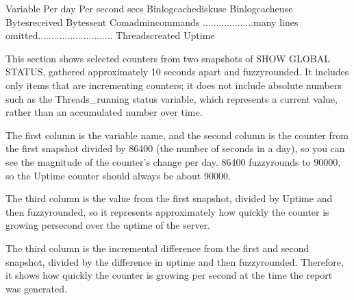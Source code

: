 \documentclass[letterpaper,10pt,english]{sphinxmanual}
\begin{document}
\begin{sphinxVerbatim}[commandchars=\\\{\}]
Variable                            Per day  Per second      secs
Binlog\PYGZus{}cache\PYGZus{}disk\PYGZus{}use                     
Binlog\PYGZus{}cache\PYGZus{}use                         
Bytes\PYGZus{}received                                       
Bytes\PYGZus{}sent                                          
Com\PYGZus{}admin\PYGZus{}commands                        
...................many lines omitted............................
Threads\PYGZus{}created                                                 
Uptime                                                      
\end{sphinxVerbatim}

\sphinxAtStartPar
This section shows selected counters from two snapshots of SHOW GLOBAL STATUS,
gathered approximately 10 seconds apart and fuzzy\sphinxhyphen{}rounded. It includes only
items that are incrementing counters; it does not include absolute numbers such
as the Threads\_running status variable, which represents a current value, rather
than an accumulated number over time.

\sphinxAtStartPar
The first column is the variable name, and the second column is the counter from
the first snapshot divided by 86400 (the number of seconds in a day), so you can
see the magnitude of the counter’s change per day. 86400 fuzzy\sphinxhyphen{}rounds to 90000,
so the Uptime counter should always be about 90000.

\sphinxAtStartPar
The third column is the value from the first snapshot, divided by Uptime and
then fuzzy\sphinxhyphen{}rounded, so it represents approximately how quickly the counter is
growing per\sphinxhyphen{}second over the uptime of the server.

\sphinxAtStartPar
The third column is the incremental difference from the first and second
snapshot, divided by the difference in uptime and then fuzzy\sphinxhyphen{}rounded. Therefore,
it shows how quickly the counter is growing per second at the time the report
was generated.
\end{document}
